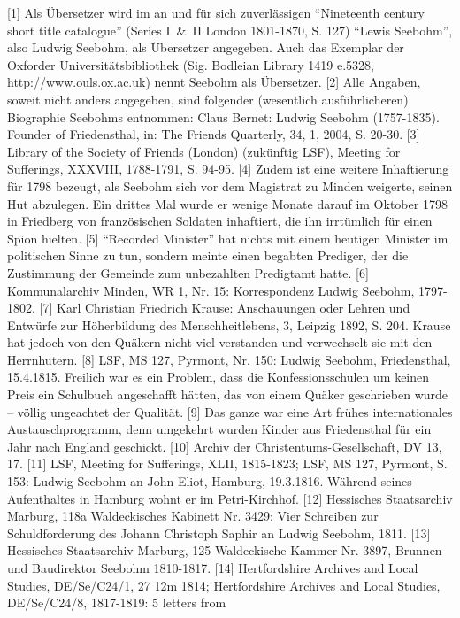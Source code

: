 [1] Als Übersetzer wird im an und für sich zuverlässigen "`Nineteenth century
short title catalogue"' (Series I~\&~II London 1801-1870, S. 127) "`Lewis
Seebohm"', also Ludwig Seebohm, als Übersetzer angegeben. Auch das Exemplar der
Oxforder Universitätsbibliothek (Sig. Bodleian Library 1419 e.5328,
http://www.ouls.ox.ac.uk) nennt Seebohm als Übersetzer.
[2] Alle Angaben, soweit nicht anders angegeben, sind folgender (wesentlich
ausführlicheren) Biographie Seebohms entnommen: Claus Bernet: Ludwig Seebohm
(1757-1835). Founder of Friedensthal, in: The Friends Quarterly, 34, 1, 2004, S.
20-30.
[3] Library of the Society of Friends (London) (zukünftig LSF), Meeting for
Sufferings, XXXVIII, 1788-1791, S. 94-95.
[4] Zudem ist eine weitere Inhaftierung für 1798 bezeugt, als Seebohm sich vor
dem Magistrat zu Minden weigerte, seinen Hut abzulegen. Ein drittes Mal wurde er
wenige Monate darauf im Oktober 1798 in Friedberg von französischen Soldaten
inhaftiert, die ihn irrtümlich für einen Spion hielten.
[5] "`Recorded Minister"' hat nichts mit einem heutigen Minister im politischen
Sinne zu tun, sondern meinte einen begabten Prediger, der die Zustimmung der
Gemeinde zum unbezahlten Predigtamt hatte.
[6] Kommunalarchiv Minden, WR 1, Nr. 15: Korrespondenz Ludwig Seebohm,
1797-1802.
[7] Karl Christian Friedrich Krause: Anschauungen oder Lehren und Entwürfe zur
Höherbildung des Menschheitlebens, 3, Leipzig 1892, S. 204. Krause hat jedoch
von den Quäkern nicht viel verstanden und verwechselt sie mit den Herrnhutern.
[8] LSF, MS 127, Pyrmont, Nr. 150: Ludwig Seebohm, Friedensthal, 15.4.1815.
Freilich war es ein Problem, dass die Konfessionsschulen um keinen Preis ein
Schulbuch angeschafft hätten, das von einem Quäker geschrieben wurde – völlig
ungeachtet der Qualität.
[9] Das ganze war eine Art frühes internationales Austauschprogramm, denn
umgekehrt wurden Kinder aus Friedensthal für ein Jahr nach England geschickt.
[10] Archiv der Christentums-Gesellschaft, DV 13, 17.
[11] LSF, Meeting for Sufferings, XLII, 1815-1823; LSF, MS 127, Pyrmont, S. 153:
Ludwig Seebohm an John Eliot, Hamburg, 19.3.1816. Während seines Aufenthaltes in
Hamburg wohnt er im Petri-Kirchhof.
[12] Hessisches Staatsarchiv Marburg, 118a Waldeckisches Kabinett Nr. 3429: Vier
Schreiben zur Schuldforderung des Johann Christoph Saphir an Ludwig Seebohm,
1811.
[13] Hessisches Staatsarchiv Marburg, 125 Waldeckische Kammer Nr. 3897, Brunnen-
und Baudirektor Seebohm 1810-1817.
[14] Hertfordshire Archives and Local Studies, DE/Se/C24/1, 27 12m 1814;
Hertfordshire Archives and Local Studies, DE/Se/C24/8, 1817-1819: 5 letters from

